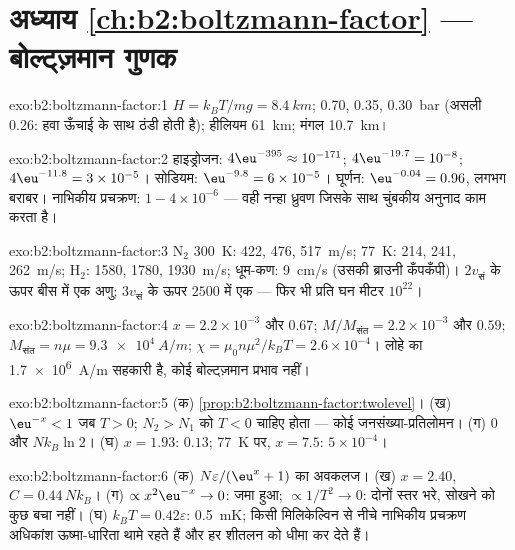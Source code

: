 \section*{अध्याय \ref{ch:b2:boltzmann-factor} --- बोल्ट्ज़मान गुणक}

\begin{solution}{exo:b2:boltzmann-factor:1}
$H = k_BT/mg = \qty{8.4}{km}$; \qty{0.70}{}, \qty{0.35}{}, \qty{0.30}{bar} (असली
\qty{0.26}{}: हवा ऊँचाई के साथ ठंडी होती है); हीलियम \qty{61}{km}; मंगल
\qty{10.7}{km}।
\end{solution}

\begin{solution}{exo:b2:boltzmann-factor:2}
हाइड्रोजन: $4\eu^{-395} \approx 10^{-171}$; $4\eu^{-19.7} = 10^{-8}$; $4\eu^{-11.8} = 3 \times
10^{-5}$। सोडियम: $\eu^{-9.8} = 6 \times 10^{-5}$। घूर्णन: $\eu^{-0.04} = 0.96$, लगभग
बराबर। नाभिकीय प्रचक्रण: $1 - 4 \times 10^{-6}$ --- वही नन्हा ध्रुवण जिसके साथ
चुंबकीय अनुनाद काम करता है।
\end{solution}

\begin{solution}{exo:b2:boltzmann-factor:3}
N$_2$ \qty{300}{K}: \qty{422}{}, \qty{476}{}, \qty{517}{m/s}; \qty{77}{K}: \qty{214}{}, \qty{241}{},
\qty{262}{m/s}; H$_2$: \qty{1580}{}, \qty{1780}{}, \qty{1930}{m/s}; धूम-कण:
\qty{9}{cm/s} (उसकी ब्राउनी कँपकँपी)। $2v_{\text{सं}}$ के ऊपर बीस में
एक अणु; $3v_{\text{सं}}$ के ऊपर $2500$ में एक --- फिर भी प्रति घन मीटर $10^{22}$।
\end{solution}

\begin{solution}{exo:b2:boltzmann-factor:4}
$x = 2.2 \times 10^{-3}$ और $0.67$; $M/M_{\text{संत}} = 2.2 \times 10^{-3}$ और $0.59$;
$M_{\text{संत}} = n\mu = \qty{9.3e4}{A/m}$; $\chi = \mu_0n\mu^2/k_BT = 2.6 \times 10^{-4}$।
लोहे का \qty{1.7e6}{A/m} सहकारी है, कोई बोल्ट्ज़मान प्रभाव नहीं।
\end{solution}

\begin{solution}{exo:b2:boltzmann-factor:5}
(क) \cref{prop:b2:boltzmann-factor:twolevel}। (ख) $\eu^{-x} < 1$ जब $T > 0$;
$N_2 > N_1$ को $T < 0$ चाहिए होता --- कोई जनसंख्या-प्रतिलोमन। (ग) $0$ और
$Nk_B\ln 2$। (घ) $x = 1.93$: $0.13$; \qty{77}{K} पर, $x = 7.5$: $5 \times 10^{-4}$।
\end{solution}

\begin{solution}{exo:b2:boltzmann-factor:6}
(क) $N\varepsilon/(\eu^x + 1)$ का अवकलज। (ख) $x = 2.40$, $C = 0.44\,Nk_B$।
(ग) $\propto x^2\eu^{-x} \to 0$: जमा हुआ; $\propto 1/T^2 \to 0$: दोनों स्तर भरे,
सोखने को कुछ बचा नहीं। (घ) $k_BT = 0.42\varepsilon$: \qty{0.5}{mK}; किसी
मिलिकेल्विन से नीचे नाभिकीय प्रचक्रण अधिकांश ऊष्मा-धारिता थामे रहते हैं और
हर शीतलन को धीमा कर देते हैं।
\end{solution}

